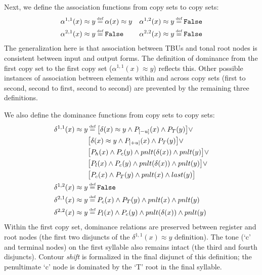 \documentclass{article}
\newcommand\myeq{\mathrel{\stackrel{\makebox[0pt]{\mbox{\normalfont\tiny def}}}{=}}}
\newcommand{\ap}{\approx}
\begin{document}
Next, we define the association functions from copy sets to copy sets:
\begin{equation} \label{association}
\begin{aligned}
\alpha^{1,1}(x)\ap y&\myeq \alpha(x)\ap y & \alpha^{1,2}(x)\ap y&\myeq \mathtt{False} \\
\alpha^{2,1}(x)\ap y&\myeq \mathtt{False} & \alpha^{2,2}(x)\ap y&\myeq \mathtt{False} \\
\end{aligned}
\end{equation}
The generalization here is that association between TBUs and tonal root nodes is consistent between input and output forms. The definition of dominance from the first copy set to the first copy set ($\alpha^{1,1}(x)\ap y$) reflects this. Other possible instances of association between elements within and across copy sets (first to second, second to first, second to second) are prevented by the remaining three definitions.\par
We also define the dominance functions from copy sets to copy sets:
\begin{equation} \label{dominance}
\begin{aligned}
\delta^{1,1}(x)\ap y&\myeq \big[\delta(x)\ap y\land P_{[-u]}(x)\land P_{T}(y)\big]\lor \\
&\big[\delta(x)\ap y\land P_{[+u]}(x)\land P_{T}(y)\big]\lor \\
&\big[P_{h}(x)\land P_{c}(y)\land pnlt(\delta(x)) \land pnlt(y)\big]\lor \\
&\big[P_{l}(x)\land P_{c}(y)\land pnlt(\delta(x)) \land pnlt(y)\big]\lor \\
&\big[P_{c}(x)\land P_{T}(y)\land pnlt(x) \land last(y)\big] \\
\delta^{1,2}(x)\ap y&\myeq \mathtt{False} \\
\delta^{2,1}(x)\ap y&\myeq P_{c}(x)\land P_{T}(y)\land pnlt(x)\land pnlt(y) \\
\delta^{2,2}(x)\ap y&\myeq P_{l}(x)\land P_{c}(y)\land pnlt(\delta(x))\land pnlt(y) \\
\end{aligned}
\end{equation}
Within the first copy set, dominance relations are preserved between register and root nodes (the first two disjuncts of the $\delta^{1,1}(x)\ap y$ definition). The tone (`c' and terminal nodes) on the first syllable also remains intact (the third and fourth disjuncts). Contour \emph{shift} is formalized in the final disjunct of this definition; the penultimate `c' node is dominated by the `T' root in the final syllable. \par
\end{document}
